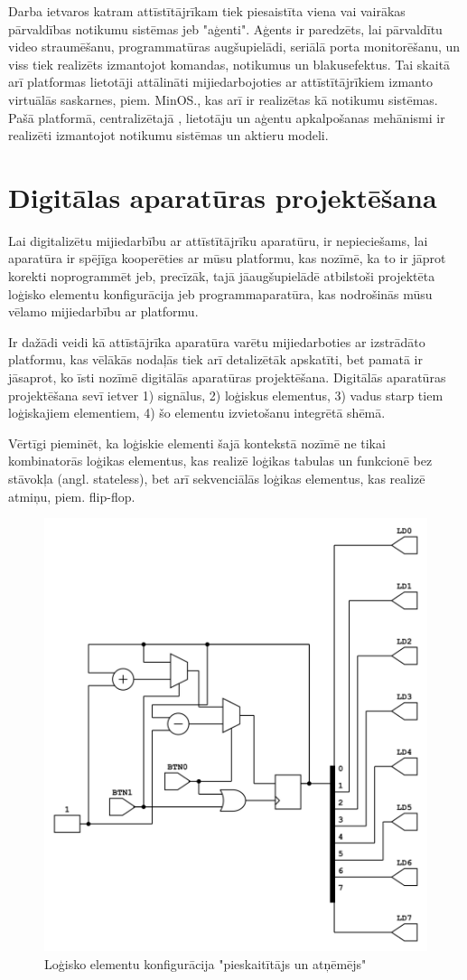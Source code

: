 Darba ietvaros katram attīstītājrīkam tiek piesaistīta viena vai vairākas
pārvaldības notikumu sistēmas jeb "aģenti". Aģents ir paredzēts, lai pārvaldītu
video straumēšanu, programmatūras augšupielādi, seriālā porta monitorēšanu, un
viss tiek realizēts izmantojot komandas, notikumus un blakusefektus. Tai skaitā
arī platformas lietotāji attālināti mijiedarbojoties ar attīstītājrīkiem izmanto
virtuālās saskarnes, piem. MinOS., kas arī ir realizētas kā notikumu sistēmas.
Pašā platformā, centralizētajā , lietotāju un aģentu
apkalpošanas mehānismi ir realizēti izmantojot notikumu sistēmas un aktieru
modeli. 

\section{Digitālas aparatūras projektēšana}

Lai digitalizētu mijiedarbību ar attīstītājrīku aparatūru, ir nepieciešams, lai
aparatūra ir spējīga kooperēties ar mūsu platformu, kas nozīmē, ka to ir jāprot
korekti noprogrammēt jeb, precīzāk, tajā jāaugšupielādē atbilstoši projektēta
loģisko elementu konfigurācija jeb programmaparatūra, kas nodrošinās mūsu vēlamo
mijiedarbību ar platformu.

Ir dažādi veidi kā attīstājrīka aparatūra varētu mijiedarboties ar izstrādāto
platformu, kas vēlākās nodaļās tiek arī detalizētāk apskatīti, bet pamatā ir
jāsaprot, ko īsti nozīmē digitālās aparatūras projektēšana. Digitālās aparatūras
projektēšana sevī ietver 1) signālus, 2) loģiskus elementus, 3) vadus starp tiem
loģiskajiem elementiem, 4) šo elementu izvietošanu integrētā shēmā. 

Vērtīgi pieminēt, ka loģiskie elementi šajā kontekstā nozīmē ne tikai
kombinatorās loģikas elementus, kas realizē loģikas tabulas un funkcionē bez
stāvokļa (angl. stateless), bet arī sekvenciālās loģikas elementus, kas realizē
atmiņu, piem. flip-flop. \cite[para 1.1]{LarryMassengale2018} 

\begin{figure}[H]
    \includegraphics[width=0.5\linewidth]{assets/counter.png}
    \centering
    \caption{Loģisko elementu konfigurācija "pieskaitītājs un atņēmējs"}
    \label{fig:counter}
\end{figure}

